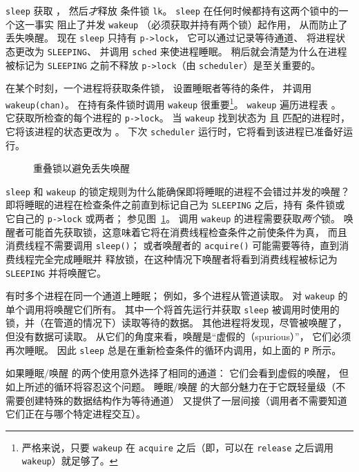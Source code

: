 \lstinline{sleep}
获取
，
然后{\it 才}释放
条件锁
\lstinline{lk}。
\lstinline{sleep} 在任何时候都持有这两个锁中的一个这一事实
阻止了并发 \lstinline{wakeup}
（必须获取并持有两个锁）起作用，
从而防止了丢失唤醒。
现在
\lstinline{sleep}
只持有
\lstinline{p->lock}，
它可以通过记录等待通道、
将进程状态更改为 \texttt{SLEEPING}、
并调用
\lstinline{sched}
来使进程睡眠。
稍后就会清楚为什么在进程被标记为 \texttt{SLEEPING} 之前不释放 \lstinline{p->lock}（由 \lstinline{scheduler}）是至关重要的。

在某个时刻，一个进程将获取条件锁，
设置睡眠者等待的条件，
并调用 \lstinline{wakeup(chan)}。
在持有条件锁时调用 \lstinline{wakeup} 很重要\footnote{%
%
严格来说，只要
\lstinline{wakeup}
在
\lstinline{acquire}
之后（即，可以在
\lstinline{release}
之后调用
\lstinline{wakeup}）就足够了。%
%
}。
\lstinline{wakeup}
遍历进程表
。
它获取所检查的每个进程的
\lstinline{p->lock}。
当 \lstinline{wakeup} 找到状态为
且
匹配的进程时，
它将该进程的状态更改为
。
下次 \lstinline{scheduler} 运行时，它将看到该进程已准备好运行。

\begin{figure}[t]
  
  \caption{重叠锁以避免丢失唤醒}
    \label{fig:overlap}
\end{figure}

\lstinline{sleep}
和
\lstinline{wakeup}
的锁定规则为什么能确保即将睡眠的进程不会错过并发的唤醒？
即将睡眠的进程在检查条件之前直到标记自己为 \texttt{SLEEPING} 之后，持有
条件锁或它自己的
\lstinline{p->lock}
或两者；
参见图~\ref{fig:overlap}。
调用 \texttt{wakeup} 的进程需要获取{\it 两个}锁。
唤醒者可能首先获取锁，这意味着它将在消费线程检查条件之前使条件为真，
而且消费线程不需要调用 {\tt sleep()}；
或者唤醒者的 {\tt acquire()} 可能需要等待，直到消费线程完全完成睡眠并
释放锁，在这种情况下唤醒者将看到消费线程被标记为 {\tt SLEEPING}
并将唤醒它。

有时多个进程在同一个通道上睡眠；
例如，多个进程从管道读取。
对
\lstinline{wakeup}
的单个调用将唤醒它们所有。
其中一个将首先运行并获取 \lstinline{sleep}
被调用时使用的锁，并（在管道的情况下）读取等待的数据。
其他进程将发现，尽管被唤醒了，
但没有数据可读取。
从它们的角度来看，唤醒是``虚假的（spurious）''，
它们必须再次睡眠。
因此 \lstinline{sleep} 总是在重新检查条件的循环内调用，如上面的 \lstinline{P} 所示。

如果睡眠/唤醒 的两个使用意外选择了相同的通道：
它们会看到虚假的唤醒，
但如上所述的循环将容忍这个问题。
睡眠/唤醒 的大部分魅力在于它既轻量级（不需要创建特殊的数据结构作为等待通道）
又提供了一层间接（调用者不需要知道它们正在与哪个特定进程交互）。
